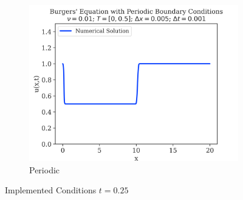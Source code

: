 \begin{figure}
\begin{subfigure}{0.55\linewidth}
		\includegraphics[width=\linewidth]{../periodic_BC/images_nu=0.01/250_plot}
		\caption{Periodic}
	\end{subfigure}

	\caption{Implemented Conditions $t=0.25$}
	\label{fig:0.25-figures}
\end{figure}

